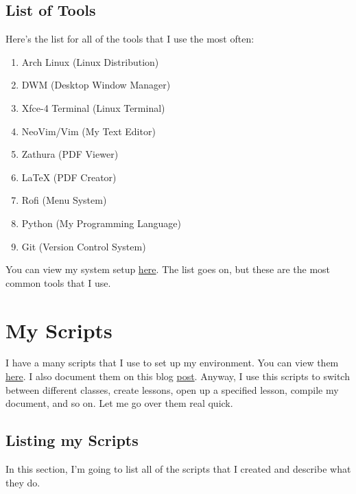 \subsection{List of Tools}
\label{sub_sec:list_of_tools}

Here's the list for all of the tools that I use the most often:

\begin{enumerate}
  \item Arch Linux (Linux Distribution)
  \item DWM (Desktop Window Manager)
  \item Xfce-4 Terminal (Linux Terminal)
  \item NeoVim/Vim (My Text Editor)
  \item Zathura (PDF Viewer)
  \item LaTeX (PDF Creator)
  \item Rofi (Menu System)
  \item Python (My Programming Language)
  \item Git (Version Control System)
\end{enumerate}

You can view my system setup
\hyperlink{https://github.com/SingularisArt/Singularis}{here}.
The list goes on, but these are the most common tools that I use.



\section{My Scripts}
\label{sec:my_scripts}

I have a many scripts that I use to set up my environment. You  can view
them
\hyperlink{https://github.com/SingularisArt/local/tree/master/scripts/school}{here}.
I also document them on this blog
\hyperlink{damrah.netlify.app/post/note-taking-with-latex-part-3/}{post}.
Anyway, I use this scripts to switch between different classes, create lessons,
open up a specified lesson, compile my document, and so on. Let me go over them
real quick.

\subsection{Listing my Scripts}
\label{sub_sec:listing_my_scripts}

In this section, I'm going to list all of the scripts that I created and
describe what they do.

